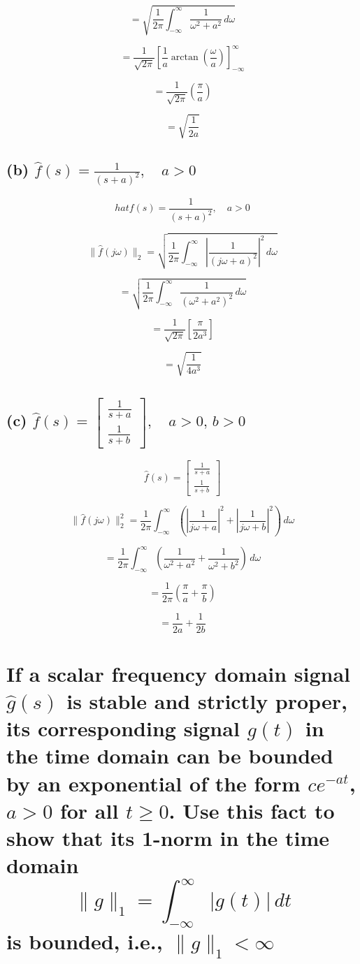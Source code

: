 \documentclass[12pt, letterpaper]{article}
\begin{document}
\[= \sqrt{\frac{1}{2\pi} \int_{-\infty}^\infty \frac{1}{\omega^2 + a^2} \, d\omega} \]

\[= \frac{1}{\sqrt{2\pi}} \left[ \frac{1}{a} \arctan\left(\frac{\omega}{a}\right) \right]_{-\infty}^\infty \]

\[= \frac{1}{\sqrt{2\pi}} \left( \frac{\pi}{a} \right) \]

\[= \sqrt{\frac{1}{2a}}\]

\subsection*{(b) $\hat{f}(s) = \frac{1}{(s + a)^2}, \quad a > 0$}

\[hat{f}(s) = \frac{1}{(s + a)^2}, \quad a > 0\]

\[
\|\hat{f}(j\omega)\|_2 = \sqrt{\frac{1}{2\pi} \int_{-\infty}^\infty \left| \frac{1}{(j\omega + a)^2} \right|^2 \, d\omega}
\]

\[
= \sqrt{\frac{1}{2\pi} \int_{-\infty}^\infty \frac{1}{(\omega^2 + a^2)^2} \, d\omega}
\]

\[
= \frac{1}{\sqrt{2\pi}} \left[ \frac{\pi}{2a^3} \right]
\]

\[
= \sqrt{\frac{1}{4a^3}}
\]

\subsection*{(c) $\hat{f}(s) = 
\begin{bmatrix}
\frac{1}{s + a} \\
\frac{1}{s + b}
\end{bmatrix}, \quad a > 0, \, b > 0$}

\[\hat{f}(s) = 
\begin{bmatrix}
\frac{1}{s + a} \\
\frac{1}{s + b}
\end{bmatrix}\]

\[
\|\hat{f}(j\omega)\|_2^2 = \frac{1}{2\pi} \int_{-\infty}^\infty \left( \left| \frac{1}{j\omega + a} \right|^2 + \left| \frac{1}{j\omega + b} \right|^2 \right) \, d\omega
\]

\[
= \frac{1}{2\pi} \int_{-\infty}^\infty \left( \frac{1}{\omega^2 + a^2} + \frac{1}{\omega^2 + b^2} \right) \, d\omega
\]

\[
= \frac{1}{2\pi} \left( \frac{\pi}{a} + \frac{\pi}{b} \right)
\]

\[
= \frac{1}{2a} + \frac{1}{2b}
\]

\section{If a scalar frequency domain signal $\hat{g}(s)$ is stable and strictly proper, its corresponding signal $g(t)$ in the time domain can be bounded by an exponential of the form $c e^{-a t}$, $a > 0$ for all $t \geq 0$. Use this fact to show that its 1-norm in the time domain
\[
\|g\|_1 = \int_{-\infty}^\infty |g(t)| \, dt
\]
is bounded, i.e., $\|g\|_1 < \infty$}
\end{document}
